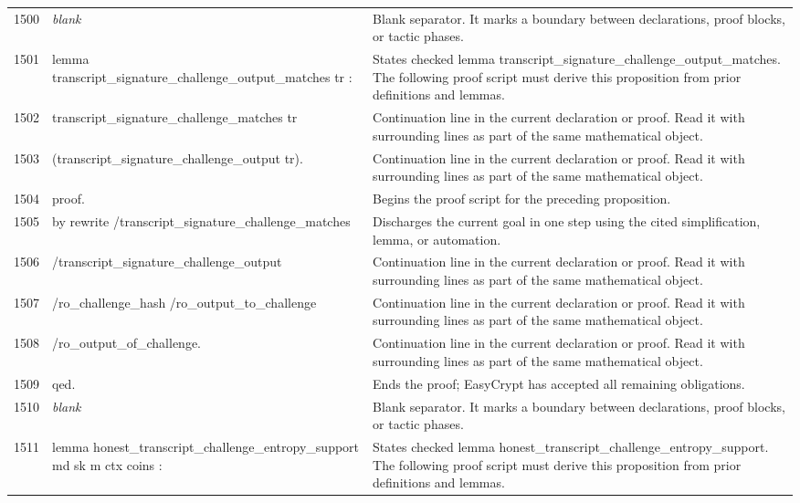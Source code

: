 \documentclass[10pt]{article}
\begin{document}
\begin{longtable}{r L{0.53\textwidth} L{0.37\textwidth}}
1500 & {\ttfamily\scriptsize \emph{blank}} & Blank separator.  It marks a boundary between declarations, proof blocks, or tactic phases. \\
1501 & {\ttfamily\scriptsize lemma transcript\_signature\_challenge\_output\_matches tr :} & States checked lemma transcript\_signature\_challenge\_output\_matches.  The following proof script must derive this proposition from prior definitions and lemmas. \\
1502 & {\ttfamily\scriptsize   transcript\_signature\_challenge\_matches tr} & Continuation line in the current declaration or proof.  Read it with surrounding lines as part of the same mathematical object. \\
1503 & {\ttfamily\scriptsize     (transcript\_signature\_challenge\_output tr).} & Continuation line in the current declaration or proof.  Read it with surrounding lines as part of the same mathematical object. \\
1504 & {\ttfamily\scriptsize proof.} & Begins the proof script for the preceding proposition. \\
1505 & {\ttfamily\scriptsize by rewrite /transcript\_signature\_challenge\_matches} & Discharges the current goal in one step using the cited simplification, lemma, or automation. \\
1506 & {\ttfamily\scriptsize            /transcript\_signature\_challenge\_output} & Continuation line in the current declaration or proof.  Read it with surrounding lines as part of the same mathematical object. \\
1507 & {\ttfamily\scriptsize            /ro\_challenge\_hash /ro\_output\_to\_challenge} & Continuation line in the current declaration or proof.  Read it with surrounding lines as part of the same mathematical object. \\
1508 & {\ttfamily\scriptsize            /ro\_output\_of\_challenge.} & Continuation line in the current declaration or proof.  Read it with surrounding lines as part of the same mathematical object. \\
1509 & {\ttfamily\scriptsize qed.} & Ends the proof; EasyCrypt has accepted all remaining obligations. \\
1510 & {\ttfamily\scriptsize \emph{blank}} & Blank separator.  It marks a boundary between declarations, proof blocks, or tactic phases. \\
1511 & {\ttfamily\scriptsize lemma honest\_transcript\_challenge\_entropy\_support md sk m ctx coins :} & States checked lemma honest\_transcript\_challenge\_entropy\_support.  The following proof script must derive this proposition from prior definitions and lemmas. \\

\end{longtable}
\end{document}
